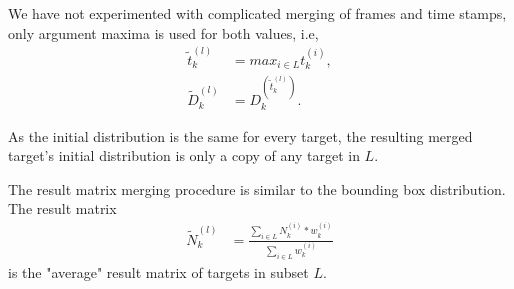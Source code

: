 We have not experimented with complicated merging of frames and time stamps, only argument maxima is used for both
values, i.e,
\begin{align}
  \tilde{t}_k^{(l)} &= max_{i \in L} t_k^{(i)}, \\
  \tilde{D}_k^{(l)} &= D_k^{(\tilde{t}_k^{(l)})}.
\end{align}

As the initial distribution is the same for every target, the resulting merged target's initial distribution is only a
copy of any target in $L$.

The result matrix merging procedure is similar to the bounding box distribution. The result matrix
\begin{align}
  \tilde{N}_k^{(l)} &= \frac{\sum_{i \in L} N_k^{(i)} * w_k^{(i)}}{\sum_{i \in L}{w_k^{(i)}}}
\end{align}
is the "average" result matrix of targets in subset $L$.

